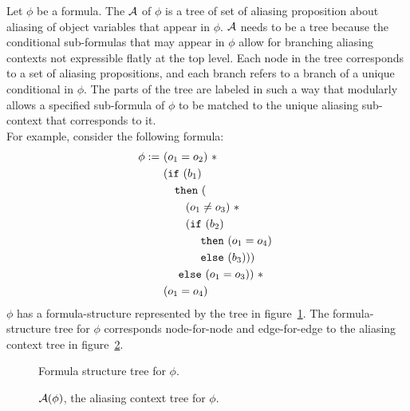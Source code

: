 Let $\phi$ be a formula.
The  $\mathcal{A}$ of $\phi$ is a tree of set of aliasing proposition about aliasing of object variables that appear in $\phi$.
$\mathcal{A}$ needs to be a tree because the conditional sub-formulas that may appear in $\phi$ allow for branching aliasing contexts not expressible flatly at the top level.
Each node in the tree corresponds to a set of aliasing propositions, and each branch refers to a branch of a unique conditional in $\phi$.
The parts of the tree are labeled in such a way that modularly allows a specified sub-formula of $\phi$ to be matched to the unique aliasing sub-context that corresponds to it.
\\
For example, consider the following formula:
\begin{align*}
  \phi
  :=
  \  & \hspace{0em} (o_1 = o_2) \ \ast
  \\ & \hspace{0em} (\texttt{if} \ (b_1)
  \\ & \hspace{1em}    \texttt{then} \ (
  \\ & \hspace{2em}      (o_1 \neq o_3) \ \ast \
  \\ & \hspace{2em}      (\texttt{if} \ (b_2)
  \\ & \hspace{3em}        \ \texttt{then} \ (o_1 = o_4) \
  \\ & \hspace{3em}        \ \texttt{else} \ (b_3)))
  \\ & \hspace{1em}    \ \texttt{else} \ (o_1 = o_3)) \ \ast
  \\ & \hspace{0em} (o_1 = o_4)
\end{align*}
$\phi$ has a formula-structure represented by the tree in figure~\ref{fig:aliasing-context-formula-example}.
The formula-structure tree for $\phi$ corresponds node-for-node and edge-for-edge to the aliasing context tree in figure~\ref{fig:aliasing-context-example}.
\\
%
\begin{figure}[h!]
  \label{fig:aliasing-context-formula-example}
  \caption{Formula structure tree for $\phi$.}
  \vspace{1em}
  
\end{figure}
%
\begin{figure}[h!]
  \label{fig:aliasing-context-example}
  \caption{$\mathcal{A}(\phi)$, the aliasing context tree for $\phi$.}
  \vspace{1em}
  
\end{figure}
